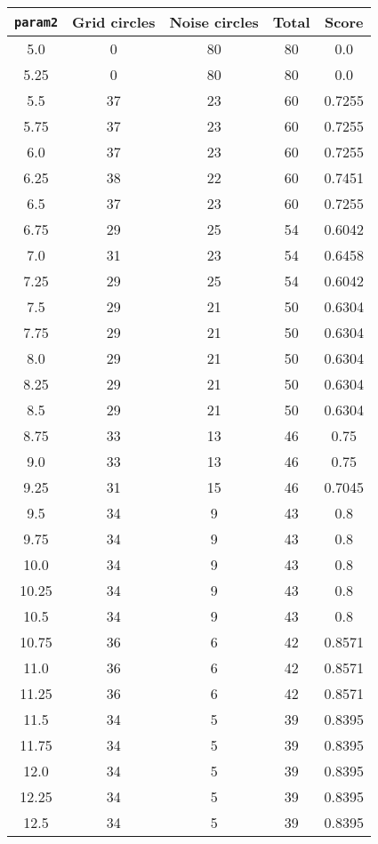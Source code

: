 \documentclass[letterpaper, 12pt]{article}
\begin{document}
\begin{longtable}{|c|c|c|c|c|}
\hline
\textbf{\texttt{param2}} & \textbf{Grid circles} & \textbf{Noise circles} & \textbf{Total} & \textbf{Score} \\
\hline
5.0 & 0 & 80 & 80 & 0.0 \\
\hline
5.25 & 0 & 80 & 80 & 0.0 \\
\hline
5.5 & 37 & 23 & 60 & 0.7255 \\
\hline
5.75 & 37 & 23 & 60 & 0.7255 \\
\hline
6.0 & 37 & 23 & 60 & 0.7255 \\
\hline
6.25 & 38 & 22 & 60 & 0.7451 \\
\hline
6.5 & 37 & 23 & 60 & 0.7255 \\
\hline
6.75 & 29 & 25 & 54 & 0.6042 \\
\hline
7.0 & 31 & 23 & 54 & 0.6458 \\
\hline
7.25 & 29 & 25 & 54 & 0.6042 \\
\hline
7.5 & 29 & 21 & 50 & 0.6304 \\
\hline
7.75 & 29 & 21 & 50 & 0.6304 \\
\hline
8.0 & 29 & 21 & 50 & 0.6304 \\
\hline
8.25 & 29 & 21 & 50 & 0.6304 \\
\hline
8.5 & 29 & 21 & 50 & 0.6304 \\
\hline
8.75 & 33 & 13 & 46 & 0.75 \\
\hline
9.0 & 33 & 13 & 46 & 0.75 \\
\hline
9.25 & 31 & 15 & 46 & 0.7045 \\
\hline
9.5 & 34 & 9 & 43 & 0.8 \\
\hline
9.75 & 34 & 9 & 43 & 0.8 \\
\hline
10.0 & 34 & 9 & 43 & 0.8 \\
\hline
10.25 & 34 & 9 & 43 & 0.8 \\
\hline
10.5 & 34 & 9 & 43 & 0.8 \\
\hline
10.75 & 36 & 6 & 42 & 0.8571 \\
\hline
11.0 & 36 & 6 & 42 & 0.8571 \\
\hline
11.25 & 36 & 6 & 42 & 0.8571 \\
\hline
11.5 & 34 & 5 & 39 & 0.8395 \\
\hline
11.75 & 34 & 5 & 39 & 0.8395 \\
\hline
12.0 & 34 & 5 & 39 & 0.8395 \\
\hline
12.25 & 34 & 5 & 39 & 0.8395 \\
\hline
12.5 & 34 & 5 & 39 & 0.8395 \\

\end{longtable}
\end{document}
